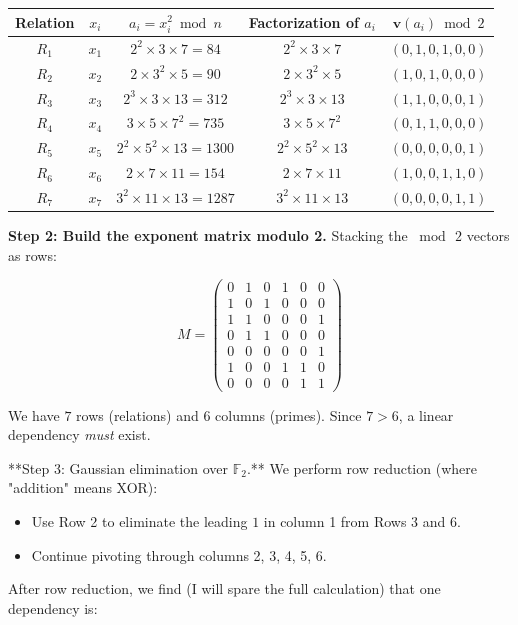 \begin{center}
\begin{tabular}{c c c c c}
\toprule
Relation & $x_i$ & $a_i = x_i^2 \bmod n$ & Factorization of $a_i$ & $\mathbf{v}(a_i) \bmod 2$ \\
\midrule
$R_1$ & $x_1$ & $2^2 \times 3 \times 7 = 84$ & $2^2 \times 3 \times 7$ & $(0, 1, 0, 1, 0, 0)$ \\
$R_2$ & $x_2$ & $2 \times 3^2 \times 5 = 90$ & $2 \times 3^2 \times 5$ & $(1, 0, 1, 0, 0, 0)$ \\
$R_3$ & $x_3$ & $2^3 \times 3 \times 13 = 312$ & $2^3 \times 3 \times 13$ & $(1, 1, 0, 0, 0, 1)$ \\
$R_4$ & $x_4$ & $3 \times 5 \times 7^2 = 735$ & $3 \times 5 \times 7^2$ & $(0, 1, 1, 0, 0, 0)$ \\
$R_5$ & $x_5$ & $2^2 \times 5^2 \times 13 = 1300$ & $2^2 \times 5^2 \times 13$ & $(0, 0, 0, 0, 0, 1)$ \\
$R_6$ & $x_6$ & $2 \times 7 \times 11 = 154$ & $2 \times 7 \times 11$ & $(1, 0, 0, 1, 1, 0)$ \\
$R_7$ & $x_7$ & $3^2 \times 11 \times 13 = 1287$ & $3^2 \times 11 \times 13$ & $(0, 0, 0, 0, 1, 1)$ \\
\bottomrule
\end{tabular}
\end{center}

\textbf{Step 2: Build the exponent matrix modulo 2.} Stacking the $\bmod\, 2$ vectors as rows:

\[
M = \begin{pmatrix} 0 & 1 & 0 & 1 & 0 & 0 \\ 1 & 0 & 1 & 0 & 0 & 0 \\ 1 & 1 & 0 & 0 & 0 & 1 \\ 0 & 1 & 1 & 0 & 0 & 0 \\ 0 & 0 & 0 & 0 & 0 & 1 \\ 1 & 0 & 0 & 1 & 1 & 0 \\ 0 & 0 & 0 & 0 & 1 & 1 \end{pmatrix}
\]

We have $7$ rows (relations) and $6$ columns (primes). Since $7 > 6$, a linear dependency \textit{must} exist.

**Step 3: Gaussian elimination over $\mathbb{F}_2$.** We perform row reduction (where "addition" means XOR):

\begin{itemize}
\item Use Row 2 to eliminate the leading $1$ in column 1 from Rows 3 and 6.
\item Continue pivoting through columns 2, 3, 4, 5, 6.
\end{itemize}
After row reduction, we find (I will spare the full calculation) that one dependency is:

